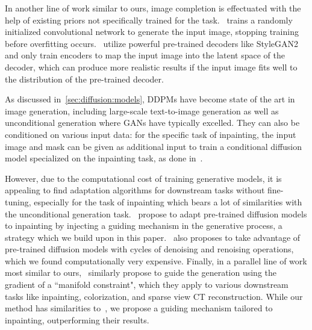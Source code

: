 
In another line of work similar to ours, image completion is effectuated with the 
help of existing priors not specifically trained for the task.~\cite{ulyanov2018deep} 
trains a randomly initialized convolutional network to generate the input image, 
stopping training before overfitting occurs.~\cite{psp, zhao2021comodgan, glean} 
utilize powerful pre-trained decoders like StyleGAN2~\citep{karra2020stylegan2} and only train
 encoders to map the input image into the latent space of the decoder, which can produce
  more realistic results if the input image fits well to the distribution of the
   pre-trained decoder. 






As discussed in~\ref{sec:diffusion:models}, \ac{DDPM}s have become state of the art in 
image generation, including large-scale text-to-image generation as well as unconditional generation 
where \ac{GAN}s have typically excelled. They can also be conditioned
 on various input data: for the specific task of inpainting, the input image and mask 
 can be given as additional input to train a conditional diffusion model specialized on
  the inpainting task, as done in~\cite{saharia2022palette}.

However, due to the computational cost of training generative models, it is appealing 
to find adaptation algorithms for downstream tasks without fine-tuning, especially for
the task of inpainting which bears a lot of similarities with the unconditional 
generation task.~\cite{rombach2022high, nichol2021glide, song2021scorebased} propose to adapt
pre-trained diffusion models to inpainting by injecting a guiding mechanism in the 
generative process, a strategy which we build upon in this paper.~\cite{lugmayr2022repaint} also
proposes to take advantage of pre-trained diffusion models with cycles of denoising 
and renoising operations, which we found computationally very expensive. Finally, 
in a parallel line of work most similar to ours,~\cite{mcg} similarly propose to
guide the generation using the gradient of a ``manifold constraint", which they apply to 
various downstream tasks like inpainting, colorization, and sparse view CT reconstruction. 
While our method has similarities to~\cite{mcg}, we propose a guiding mechanism tailored to 
inpainting, outperforming their results.


